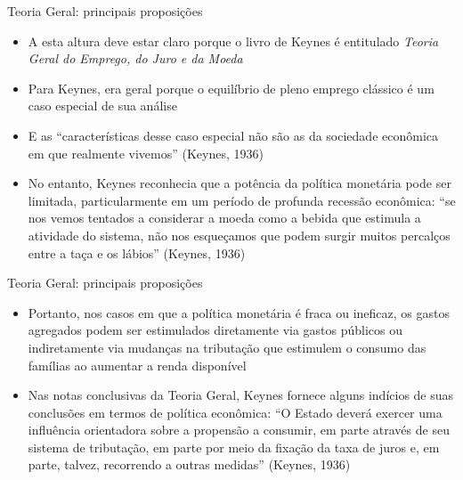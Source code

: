 \documentclass[10pt]{beamer}
\begin{document}
\begin{frame}{Teoria Geral: principais proposições}
    \begin{itemize}
        \item A esta altura deve estar claro porque o livro de Keynes é entitulado \emph{Teoria Geral do Emprego, do Juro e da Moeda}
        \bigskip
        \item Para Keynes, era geral porque o equilíbrio de pleno emprego clássico é um caso especial de sua análise
        \bigskip
        \item E as ``características desse caso especial não são as da sociedade econômica em que realmente vivemos'' (Keynes, 1936)
        \bigskip
        \item No entanto, Keynes reconhecia que a potência da política monetária pode ser limitada, particularmente em um período de profunda recessão econômica: ``se nos vemos tentados a considerar a moeda como a bebida que estimula a atividade do sistema, não nos esqueçamos que podem surgir muitos percalços entre a taça e os lábios'' (Keynes, 1936)
    \end{itemize}
\end{frame}

\begin{frame}{Teoria Geral: principais proposições}
    \begin{itemize}
        \item Portanto, nos casos em que a política monetária é fraca ou ineficaz, os gastos agregados podem ser estimulados diretamente via gastos públicos ou indiretamente via mudanças na tributação que estimulem o consumo das famílias ao aumentar a renda disponível
        \bigskip
        \item Nas notas conclusivas da Teoria Geral, Keynes fornece alguns indícios de suas conclusões em termos de política econômica: ``O Estado deverá exercer uma influência orientadora sobre a propensão a consumir, em parte através de seu sistema de tributação, em parte por meio da fixação da taxa de juros e, em parte, talvez, recorrendo a outras medidas'' (Keynes, 1936)
    \end{itemize}
\end{frame}
\end{document}
